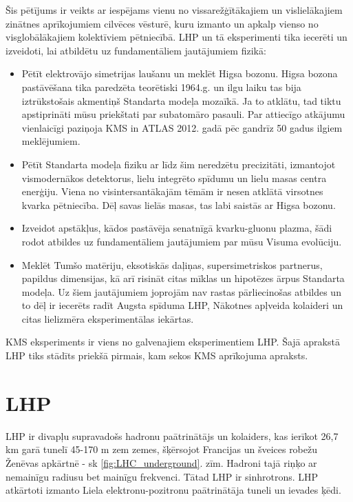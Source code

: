 \label{sec:experimental_setup}

Šis pētījums ir veikts ar iespējams vienu no vissarežģītākajiem un vislielākajiem zinātnes aprīkojumiem cilvēces vēsturē, kuru izmanto un apkalp vienso no visglobālākajiem kolektīviem pētniecībā. LHP un tā eksperimenti tika iecerēti un izveidoti, lai atbildētu uz fundamentāliem jautājumiem fizikā:

\begin{itemize}
\item Pētīt elektrovājo simetrijas laušanu un meklēt Higsa bozonu. Higsa bozona pastāvēšana tika paredzēta teorētiski 1964.g.  \cite{Higgs:1964ia} \cite{Englert:1964et} un ilgu laiku tas bija iztrūkstošais akmentiņš Standarta modeļa mozaīkā. Ja to atklātu, tad tiktu apstiprināti mūsu priekštati par subatomāro pasauli. Par attiecīgo atkājumu vienlaicīgi paziņoja KMS in ATLAS 2012. gadā \cite{Chatrchyan:2012xdj} \cite{Aad:2012tfa} pēc gandrīz 50 gadus ilgiem meklējumiem.
\item Pētīt Standarta modeļa fiziku ar līdz šim neredzētu precizitāti, izmantojot vismodernākos detektorus, lielu integrēto spīdumu un lielu masas centra enerģiju. Viena no visintersantākajām tēmām ir nesen atklātā virsotnes kvarka pētniecība. Dēļ savas lielās masas, tas labi saistās ar Higsa bozonu.
\item Izveidot apstākļus, kādos pastāvēja senatnīgā kvarku-gluonu plazma, šādi rodot atbildes uz fundamentāliem jautājumiem par mūsu Visuma evolūciju.
\item Meklēt Tumšo matēriju, eksotiskās daļiņas, supersimetriskos partnerus, \gls{papildus dimensijas}, kā arī risināt citas mīklas un hipotēzes ārpus Standarta modeļa. Uz šiem jautājumiem joprojām nav rastas pārliecinošas atbildes un to dēļ ir iecerēts radīt \gls{Augsta spīduma LHP}, \gls{Nākotnes apļveida kolaideri} un citas lielizmēra eksperimentālas iekārtas. 
\end {itemize}

KMS eksperiments ir viens no galvenajiem eksperimentiem LHP. Šajā aprakstā LHP tiks stādīts priekšā pirmais, kam sekos KMS aprīkojuma apraksts.

\section{LHP}

LHP ir divapļu supravadošs hadronu paātrinātājs un kolaiders, kas ierīkot 26,7 km garā tunelī 45-170 m zem zemes, šķērsojot Francijas un šveices robežu Ženēvas apkārtnē - sk \ref{fig:LHC_underground}. zīm. Hadroni tajā riņķo ar nemainīgu radiusu bet mainīgu frekvenci. Tātad LHP ir sinhrotrons. LHP atkārtoti izmanto Liela elektronu-pozitronu paātrinātāja tuneli un \gls{ievades ķēdi}.

